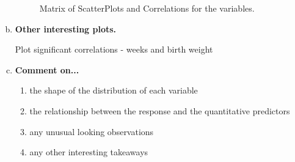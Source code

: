 \documentclass{article}\usepackage[]{graphicx}\usepackage[]{xcolor}
\makeatletter
\newenvironment{kframe}{%
 \def\at@end@of@kframe{}%
 \ifinner\ifhmode%
  \def\at@end@of@kframe{\end{minipage}}%
  \begin{minipage}{\columnwidth}%
 \fi\fi%
 \def\FrameCommand##1{\hskip\@totalleftmargin \hskip-\fboxsep
 \colorbox{shadecolor}{##1}\hskip-\fboxsep
     \hskip-\linewidth \hskip-\@totalleftmargin \hskip\columnwidth}%
 \MakeFramed {\advance\hsize-\width
   \@totalleftmargin\z@ \linewidth\hsize
   \@setminipage}}%
 {\par\unskip\endMakeFramed%
 \at@end@of@kframe}
\newenvironment{knitrout}{}{} %
\makeatother
\begin{document}
\begin{enumerate}[a.]
\begin{figure}[H]
\begin{knitrout}
\begin{kframe}
{\ttfamily\noindent\bfseries\color{errorcolor}{\#\# Error in eval(expr, envir, enclos): object 'correlationsmatrix' not found}}\end{kframe}
\end{knitrout}
\caption{Matrix of ScatterPlots and Correlations for the variables.}
\label{CorrelationSummary}
\end{figure}

\item\textbf{Other interesting plots.}

Plot significant correlations 
- weeks and birth weight

\item\textbf{Comment on...}
\begin{enumerate}[]
\item{the shape of the distribution of each variable}
\item{the relationship between the response and the quantitative predictors}
\item{any unusual looking observations}
\item{any other interesting takeaways}


\end{enumerate}
\end{enumerate}
\end{document}
